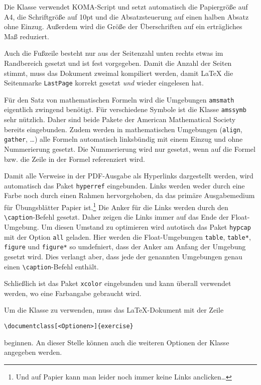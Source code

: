 \documentclass{exercise}
\begin{document}
    Die Klasse verwendet KOMA-Script \cite{koma} und setzt automatisch die
    Papiergröße auf A4, die Schriftgröße auf 10pt und die Absatzsteuerung auf
    einen halben Absatz ohne Einzug. Außerdem wird die Größe der Überschriften
    auf ein erträgliches Maß reduziert.
    
    Auch die Fußzeile besteht nur aus der Seitenzahl unten rechts etwas im
    Randbereich gesetzt und ist fest vorgegeben. Damit die Anzahl der Seiten
    stimmt, muss das Dokument zweimal kompiliert werden, damit \LaTeX{} die
    Seitenmarke \texttt{LastPage} korrekt gesetzt \emph{und} wieder eingelesen hat.
    
    Für den Satz von mathematischen Formeln wird die Umgebungen \texttt{amsmath}
    \cite{amsmath} eigentlich zwingend benötigt. Für verschiedene Symbole ist
    die Klasse \texttt{amssymb} sehr nützlich. Daher sind beide Pakete der
    American Mathematical Society bereits eingebunden. Zudem werden in
    mathematischen Umgebungen (\texttt{align}, \texttt{gather}, \ldots) alle
    Formeln automatisch linksbündig mit einem Einzug und ohne Nummerierung
    gesetzt. Die Nummerierung wird nur gesetzt, wenn auf die Formel bzw. die
    Zeile in der Formel referenziert wird. 
    
    Damit alle Verweise in der PDF-Ausgabe als Hyperlinks dargestellt werden,
    wird automatisch das Paket \texttt{hyperref} \cite{hyperref} eingebunden.
    Links werden weder durch eine Farbe noch durch einen Rahmen hervorgehoben,
    da das primäre Ausgabemedium für Übungsblätter Papier ist.\footnote{Und
    auf Papier kann man leider noch immer keine Links anclicken\ldots} Die
    Anker für die Links werden durch den \lstinline{\caption}-Befehl gesetzt. Daher
    zeigen die Links immer auf das Ende der Float-Umgebung. Um diesen Umstand
    zu optimieren wird autotisch das Paket \texttt{hypcap} \cite{hypcap} mit der
    Option \texttt{all} geladen. Hier werden die Float-Umgebungen \lstinline{table},
    \lstinline{table*}, \lstinline{figure} und \lstinline{figure*} so umdefniert, dass
    der Anker am Anfang der Umgebung gesetzt wird. Dies verlangt aber, dass jede
    der genannten Umgebungen genau einen \lstinline{\caption}-Befehl enthält.
    
    Schließlich ist das Paket \texttt{xcolor} \cite{xcolor} eingebunden und kann
    überall verwendet werden, wo eine Farbangabe gebraucht wird.
    
    Um die Klasse zu verwenden, muss das \LaTeX{}-Dokument mit der Zeile
    \begin{lstlisting}[gobble=6]
      \documentclass[<Optionen>]{exercise}
    \end{lstlisting} 
    beginnen. An dieser Stelle können auch die weiteren Optionen der Klasse
    angegeben werden.
    
\end{document}
